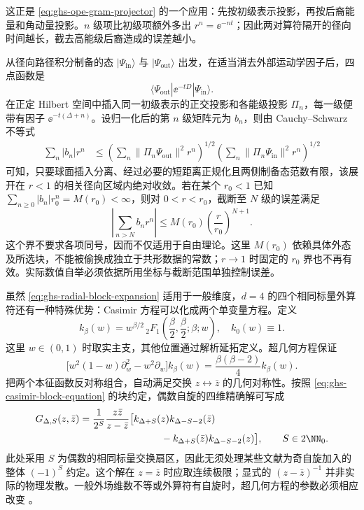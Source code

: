 这正是 \cref{eq:ghs-ope-gram-projector} 的一个应用：先按初级表示投影，再按后裔能量和角动量投影。$n$ 级项比初级项额外多出 $r^n=\ee^{-nt}$；因此两对算符隔开的径向时间越长，截去高能级后裔造成的误差越小。


从径向路径积分制备的态 $|\Psi_\mathrm{in}\rangle$ 与 $|\Psi_\mathrm{out}\rangle$ 出发，在适当消去外部运动学因子后，四点函数是
\begin{equation}\label{eq:ghs-radial-matrix-element}
 \langle\Psi_\mathrm{out}|\ee^{-tD}|\Psi_\mathrm{in}\rangle.
\end{equation}
在正定 Hilbert 空间中插入同一初级表示的正交投影和各能级投影 $\Pi_n$，每一级便带有因子 $\ee^{-t(\Delta+n)}$。设归一化后的第 $n$ 级矩阵元为 $b_n$，则由 Cauchy--Schwarz 不等式
\begin{align*}
 \sum_n|b_n|r^n
 &\le\left(\sum_n\|\Pi_n\Psi_\mathrm{out}\|^2r^n\right)^{1/2}
       \left(\sum_n\|\Pi_n\Psi_\mathrm{in}\|^2r^n\right)^{1/2}
\end{align*}
可知，只要球面插入分离、经过必要的短距离正规化且两侧制备态范数有限，该展开在 $r<1$ 的相关径向区域内绝对收敛。若在某个 $r_0<1$ 已知 $\sum_{n\ge0}|b_n|r_0^n=M(r_0)<\infty$，则对 $0<r<r_0$，截断至 $N$ 级的误差满足
\begin{equation}\label{eq:ghs-radial-tail-bound}
 \left|\sum_{n>N}b_nr^n\right|
 \le M(r_0)\left(\frac r{r_0}\right)^{N+1}.
\end{equation}
这个界不要求各项同号，因而不仅适用于自由理论。这里 $M(r_0)$ 依赖具体外态及所选块，不能被偷换成独立于共形数据的常数；$r\to1$ 时固定的 $r_0$ 界也不再有效。实际数值自举必须依据所用坐标与截断范围单独控制误差。


虽然 \cref{eq:ghs-radial-block-expansion} 适用于一般维度，$d=4$ 的四个相同标量外算符还有一种特殊优势：Casimir 方程可以化成两个单变量方程。定义
\begin{equation}\label{eq:ghs-block-hypergeometric}
 k_\beta(w)=w^{\beta/2}\,{}_2F_1\left(\frac\beta2,\frac\beta2;\beta;w\right),
 \quad k_0(w)\equiv1.
\end{equation}
这里 $w\in(0,1)$ 时取实主支，其他位置通过解析延拓定义。超几何方程保证
\begin{equation}\label{eq:ghs-block-k-ode}
 \bigl[w^2(1-w)\partial_w^2-w^2\partial_w\bigr]k_\beta(w)
 =\frac{\beta(\beta-2)}4k_\beta(w).
\end{equation}
把两个本征函数反对称组合，自动满足交换 $z\leftrightarrow\bar z$ 的几何对称性。按照 \cref{eq:ghs-casimir-block-equation} 的块约定，偶数自旋的四维精确解可写成
\begin{align}\label{eq:ghs-four-dimensional-exact-block}
 G_{\Delta,S}(z,\bar z)
 ={}&\frac{1}{2^S}\frac{z\bar z}{z-\bar z}
 \bigl[k_{\Delta+S}(z)k_{\Delta-S-2}(\bar z)\\
 &\hspace{7em}-k_{\Delta+S}(\bar z)k_{\Delta-S-2}(z)\bigr],
 \qquad S\in2\NN_0.\notag
\end{align}
此处采用 $S$ 为偶数的相同标量交换扇区，因此无须处理某些文献为奇自旋加入的整体 $(-1)^S$ 约定。这个解在 $z=\bar z$ 时应取连续极限；显式的 $(z-\bar z)^{-1}$ 并非实际的物理发散。一般外场维数不等或外算符有自旋时，超几何方程的参数必须相应改变 \cite{ghs-simmons,ghs-dolan-osborn}。


